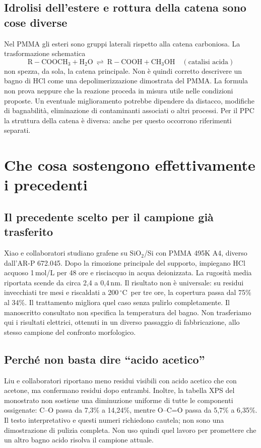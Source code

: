 \documentclass[11pt,reqno]{amsart}
\numberwithin{equation}{section}
\newcommand{\SiO}{\ensuremath{\mathrm{SiO}_2}}
\newcommand{\degC}{\ensuremath{^{\circ}\mathrm{C}}}
\newcommand{\nm}{\ensuremath{\mathrm{nm}}}
\begin{document}
\subsection{Idrolisi dell'estere e rottura della catena sono cose diverse}
Nel PMMA gli esteri sono gruppi laterali rispetto alla catena carboniosa.
La trasformazione schematica
\begin{equation}\label{eq:hydrolysis}
 \mathrm{R{-}COOCH_3+H_2O}
 \ \rightleftharpoons\ 
 \mathrm{R{-}COOH+CH_3OH}
 \quad(\text{catalisi acida})
\end{equation}
non spezza, da sola, la catena principale. Non \`e quindi corretto
descrivere un bagno di HCl come una depolimerizzazione dimostrata del
PMMA. La formula non prova neppure che la reazione proceda in misura
utile nelle condizioni proposte. Un eventuale miglioramento potrebbe
dipendere da distacco, modifiche di bagnabilit\`a, eliminazione di
contaminanti associati o altri processi. Per il PPC la struttura della
catena \`e diversa: anche per questo occorrono riferimenti separati.

\section{Che cosa sostengono effettivamente i precedenti}

\subsection{Il precedente scelto per il campione gi\`a trasferito}
Xiao e collaboratori \cite{Xiao2019} studiano grafene su \SiO/Si
con PMMA 495K A4, diverso dall'AR-P 672.045. Dopo la rimozione
principale del supporto, impiegano HCl acquoso 1\,mol/L per 48 ore e
risciacquo in acqua deionizzata. La rugosit\`a media riportata scende
da circa 2,4 a 0,4\,\nm. Il risultato non \`e universale: su residui
invecchiati tre mesi e riscaldati a 200\,\degC\ per tre ore, la
copertura passa dal 75\% al 34\%. Il trattamento migliora quel caso
senza pulirlo completamente. Il manoscritto consultato non specifica
la temperatura del bagno. Non trasferiamo qui i risultati elettrici,
ottenuti in un diverso passaggio di fabbricazione, allo stesso campione
del confronto morfologico.

\subsection{Perch\'e non basta dire ``acido acetico''}
Liu e collaboratori \cite{Liu2023} riportano meno residui visibili
con acido acetico che con acetone, ma confermano residui dopo entrambi.
Inoltre, la tabella XPS del monostrato non sostiene una diminuzione
uniforme di tutte le componenti ossigenate: C--O passa da 7,3\% a
14,24\%, mentre O--C=O passa da 5,7\% a 6,35\%.
Il testo interpretativo e questi numeri richiedono cautela; non sono una
dimostrazione di pulizia completa. Non uso quindi quel lavoro per
promettere che un altro bagno acido risolva il campione attuale.
\end{document}
